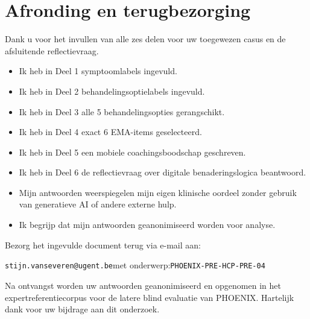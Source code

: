 \documentclass[11pt,a4paper]{article}
\begin{document}
\section{Afronding en terugbezorging}

Dank u voor het invullen van alle zes delen voor uw toegewezen casus
en de afsluitende reflectievraag.

\begin{instrbox}[title=Checklist voor terugbezorging]
\begin{itemize}
\item[$\square$] Ik heb in Deel 1 symptoomlabels ingevuld.
\item[$\square$] Ik heb in Deel 2 behandelingsoptielabels ingevuld.
\item[$\square$] Ik heb in Deel 3 alle 5 behandelingsopties gerangschikt.
\item[$\square$] Ik heb in Deel 4 exact 6 EMA-items geselecteerd.
\item[$\square$] Ik heb in Deel 5 een mobiele coachingsboodschap geschreven.
\item[$\square$] Ik heb in Deel 6 de reflectievraag over digitale benaderingslogica beantwoord.
\item[$\square$] Mijn antwoorden weerspiegelen mijn eigen klinische oordeel zonder gebruik van generatieve AI of andere externe hulp.
\item[$\square$] Ik begrijp dat mijn antwoorden geanonimiseerd worden voor analyse.
\end{itemize}
\end{instrbox}

\medskip
Bezorg het ingevulde document terug via e-mail aan:
\begin{center}
\texttt{stijn.vanseveren@ugent.be}\quad met onderwerp:\quad \texttt{PHOENIX-PRE-HCP-PRE-04}
\end{center}

\vspace{0.5em}
\begin{tcolorbox}[colback=AccentBlue,colframe=PrimaryBlue,arc=2mm,boxrule=0.6pt,left=8pt,right=8pt,top=7pt,bottom=7pt]
\small\centering
Na ontvangst worden uw antwoorden geanonimiseerd en opgenomen in het expertreferentiecorpus
voor de latere blind evaluatie van PHOENIX. Hartelijk dank voor uw bijdrage aan dit onderzoek.
\end{tcolorbox}
\end{document}
